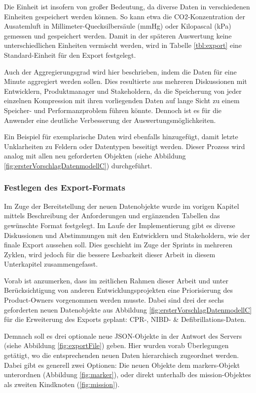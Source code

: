 Die Einheit ist insofern von großer Bedeutung, da diverse Daten in verschiedenen Einheiten gespeichert werden können.
So kann etwa die CO2-Konzentration der Ausatemluft in Millimeter-Quecksilbersäule (mmHg) oder Kilopascal (kPa) gemessen und gespeichert werden.
Damit in der späteren Auswertung keine unterschiedlichen Einheiten vermischt werden, wird in Tabelle \ref{tbl:export} eine Standard-Einheit für den Export festgelegt.

Auch der Aggregierungsgrad wird hier beschrieben, indem die Daten für eine Minute aggregiert werden sollen.
Dies resultierte aus mehreren Diskussionen mit Entwicklern, Produktmanager und Stakeholdern, da die Speicherung von jeder einzelnen Kompression mit ihren vorliegenden Daten auf lange Sicht zu einem Speicher- und Performanzproblem führen könnte.
Dennoch ist es für die Anwender eine deutliche Verbesserung der Auswertungsmöglichkeiten.

Ein Beispiel für exemplarische Daten wird ebenfalls hinzugefügt, damit letzte Unklarheiten zu Feldern oder Datentypen beseitigt werden.
Dieser Prozess wird analog mit allen neu geforderten Objekten (siehe Abbildung \ref{fig:ersterVorschlagDatenmodellC}) durchgeführt. 

\subsubsection{Festlegen des Export-Formats}
Im Zuge der Bereitstellung der neuen Datenobjekte wurde im vorigen Kapitel mittels Beschreibung der Anforderungen und ergänzenden Tabellen das gewünschte Format festgelegt.
Im Laufe der Implementierung gibt es diverse Diskussionen und Abstimmungen mit den Entwicklern und Stakeholdern, wie der finale Export aussehen soll.
Dies geschieht im Zuge der \glqq Sprints\grqq{} in mehreren Zyklen, wird jedoch für die bessere Lesbarkeit dieser Arbeit in diesem Unterkapitel zusammengefasst.

Vorab ist anzumerken, dass im zeitlichen Rahmen dieser Arbeit und unter Berücksichtigung von anderen Entwicklungsprojekten eine Priorisierung des Product-Owners vorgenommen werden musste.
Dabei sind drei der sechs geforderten neuen Datenobjekte aus Abbildung \ref{fig:ersterVorschlagDatenmodellC} für die Erweiterung des Exports  geplant: \gls{CPR}-, \gls{NIBD}- \& Defibrillations-Daten.

Demnach soll es drei optionale neue JSON-Objekte in der Antwort des Servers (siehe Abbildung \ref{fig:exportFile}) geben.
Hier wurden vorab Überlegungen getätigt, wo die entsprechenden neuen Daten hierarchisch zugeordnet werden.
Dabei gibt es generell zwei Optionen:
Die neuen Objekte dem \glqq markers\grqq-Objekt unterordnen (Abbildung \ref{fig:marker}), oder direkt unterhalb des \glqq mission\grqq-Objektes als zweiten Kindknoten (\ref{fig:mission}).


